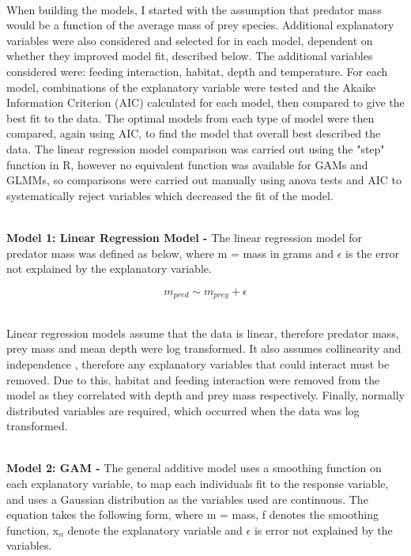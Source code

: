 \documentclass[11pt,a4paper]{article}
\begin{document}
	\par \noindent ~\\When building the models, I started with the assumption that predator mass would be a function of the average mass of prey species. Additional explanatory variables were also considered and selected for in each model, dependent on whether they improved model fit, described below. The additional variables considered were: feeding interaction, habitat, depth and temperature. For each model, combinations of the explanatory variable were tested and the Akaike Information Criterion (AIC) calculated for each model, then compared to give the best fit to the data. The optimal models from each type of model were then compared, again using AIC, to find the model that overall best described the data. The linear regression model comparison was carried out using the "step" function in R, however no equivalent function was available for GAMs and GLMMs, so comparisons were carried out manually using anova tests and AIC to systematically reject variables which decreased the fit of the model. 
	
	\par \noindent ~\\ \textbf{Model 1: Linear Regression Model -}  The linear regression model for predator mass was defined as below, where m = mass in grams and $\epsilon$ is the error not explained by the explanatory variable. 
	
		\begin{equation*}
			m_{pred} \sim m_{prey} + \epsilon
		\end{equation*}
	
	\noindent ~\\ Linear regression models assume that the data is linear, therefore predator mass, prey mass and mean depth were log transformed. It also assumes collinearity and independence \citep{Zuur2009}, therefore any explanatory variables that could interact must be removed. Due to this, habitat and feeding interaction were removed from the model as they correlated with depth and prey mass respectively. Finally, normally distributed variables are required, which occurred when the data was log transformed.
	
	\par \noindent ~\\ \textbf{Model 2: GAM -} The general additive model uses a smoothing function on each explanatory variable, to map each individuals fit to the response variable, and uses a Gaussian distribution as the variables used are continuous. The equation takes the following form, where m = mass, f denotes the smoothing function, x$_{n}$ denote the explanatory variable and $\epsilon$ is error not explained by the variables.
	
\end{document}

